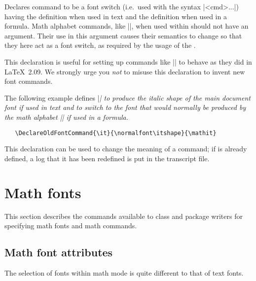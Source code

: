 \documentclass{ltxguide}[1995/11/28]
\begin{document}
Declares command  to be a font switch (i.e.~used with the
syntax |{<cmd>...}|) having the definition 
when used in text and the definition  when used in a
formula.
Math alphabet commands, like |\mathit|, when used within 
should not have an argument.  Their use in this argument causes their
semantics to change so that they here act as a font switch, as
required by the usage of the .
 
This declaration is useful for setting up commands like |\rm| to behave
as they did in \LaTeX~2.09. We strongly urge you \emph{not} to misuse
this declaration to invent new font commands.
 
The following example defines |\it| to produce the italic shape of the
main document font if used in text and to switch to the font that would
normally be produced by the math alphabet |\mathit| if used in a
formula.
\begin{verbatim}
   \DeclareOldFontCommand{\it}{\normalfont\itshape}{\mathit}
\end{verbatim}
 
This declaration can be used to change the meaning of a command; if
 is already defined, a log that it has been redefined
is put in the transcript file.
 
 
\section{Math fonts}
\label{Sec:math}
 
This section describes the commands available to class and package
writers for specifying math fonts and math commands.
 
\subsection{Math font attributes}
 
The selection of fonts within math mode is quite different to that of
text fonts.
 
\end{document}
